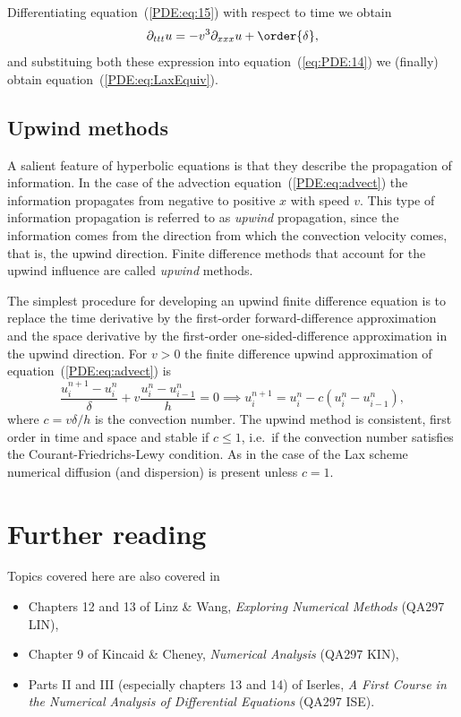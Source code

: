 %
Differentiating equation~(\ref{PDE:eq:15}) with respect to time we
obtain
%
\begin{equation*}
  \partial_{t t t} u = -v^3 \partial_{x x x} u + \order{\delta} ,
\end{equation*}
%
and substituing both these expression into equation~(\ref{eq:PDE:14})
we (finally) obtain equation~(\ref{PDE:eq:LaxEquiv}).

\subsection{Upwind methods}

A salient feature of hyperbolic equations is that they describe the
propagation of information.  In the case of the advection
equation~(\ref{PDE:eq:advect}) the information propagates from
negative to positive $x$ with speed $v$.  This type of information
propagation is referred to as \textit{upwind} propagation, since the
information comes from the direction from which the convection
velocity comes, that is, the upwind direction.  Finite difference
methods that account for the upwind influence are called
\textit{upwind} methods.

The simplest procedure for developing an upwind finite difference
equation is to replace the time derivative by the first-order
forward-difference approximation and the space derivative by the
first-order one-sided-difference approximation in the upwind
direction.  For $v > 0$ the finite difference upwind approximation of
equation~(\ref{PDE:eq:advect}) is
%
\begin{equation}
  \frac{u_{i}^{n+1}-u_{i}^{n}}{\delta} + v
  \frac{u_{i}^{n} - u_{i-1}^{n}}{h} = 0 \implies
  u_{i}^{n+1} = u_{i}^{n} - c ( u_{i}^{n} - u_{i-1}^{n} ) ,
  \label{eq:PDE:Upw}
\end{equation}
%
where $c=v \delta/h$ is the convection number.  The upwind method is
consistent, first order in time and space and stable if $c \le 1$,
i.e.\ if the convection number satisfies the Courant-Friedrichs-Lewy
condition.  As in the case of the Lax scheme numerical diffusion (and
dispersion) is present unless $c=1$.

\section*{Further reading}

Topics covered here are also covered in
\begin{itemize}
\item Chapters 12 and 13 of Linz \& Wang, \textit{Exploring Numerical
    Methods} (QA297 LIN),
\item Chapter 9 of Kincaid \& Cheney, \textit{Numerical Analysis}
  (QA297 KIN),
\item Parts II and III (especially chapters 13 and 14) of Iserles,
  \textit{A First Course in the Numerical Analysis of Differential
    Equations} (QA297 ISE).
\end{itemize}
